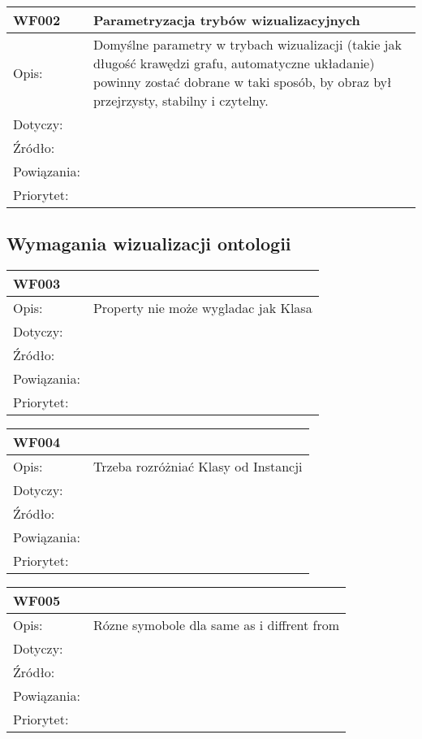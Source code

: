 \documentclass[a4paper,10pt]{article}
\begin{document}
\begin{tabular}{|p{3cm}|p{9cm}|} \hline

WF002 & Parametryzacja trybów wizualizacyjnych \\ \hline
Opis: & Domyślne parametry w trybach wizualizacji (takie jak długość krawędzi grafu, automatyczne układanie) powinny zostać dobrane w taki sposób, by obraz był przejrzysty, stabilny i czytelny.    \\ \hline
Dotyczy: &  \\ \hline
Źródło: &  \\ \hline
Powiązania: & \\ \hline
Priorytet: &  \\ \hline

\end{tabular}



\subsection{Wymagania wizualizacji ontologii}

\begin{tabular}{|p{3cm}|p{9cm}|} \hline

WF003 &   \\ \hline
Opis: &  Property nie może wygladac jak Klasa   \\ \hline
Dotyczy: &  \\ \hline
Źródło: &  \\ \hline
Powiązania: & \\ \hline
Priorytet: &  \\ \hline

\end{tabular}

\begin{tabular}{|p{3cm}|p{9cm}|} \hline

WF004 &  \\ \hline
Opis: & Trzeba rozróżniać Klasy od Instancji    \\ \hline
Dotyczy: &  \\ \hline
Źródło: &  \\ \hline
Powiązania: & \\ \hline
Priorytet: &  \\ \hline

\end{tabular}

\begin{tabular}{|p{3cm}|p{9cm}|} \hline

WF005 &  \\ \hline
Opis: & Rózne symobole dla same as i diffrent from   \\ \hline
Dotyczy: &  \\ \hline
Źródło: &  \\ \hline
Powiązania: & \\ \hline
Priorytet: &  \\ \hline

\end{tabular}
\end{document}
